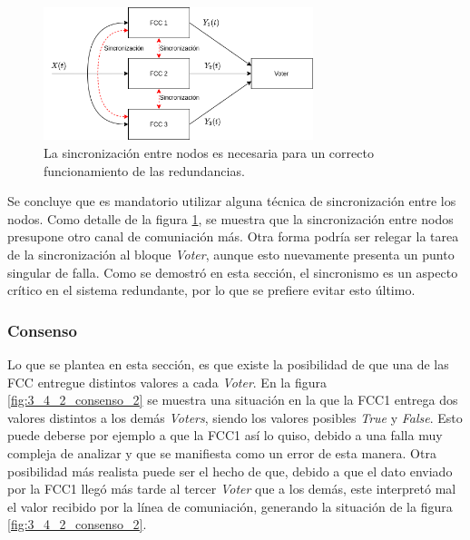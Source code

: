\begin{figure}[H]
    \centering
    \includegraphics[width=0.7\textwidth]{img/3_4_1_sincronizacion_3.png}
    \caption{La sincronización entre nodos es necesaria para un correcto funcionamiento de las redundancias.}
    \label{fig:3_4_1_sincronizacion_3}
\end{figure}

Se concluye que es mandatorio utilizar alguna técnica de sincronización entre los nodos. Como detalle de la figura \ref{fig:3_4_1_sincronizacion_3}, se muestra que la sincronización entre nodos presupone otro canal de comuniación más. Otra forma podría ser relegar la tarea de la sincronización al bloque \textit{Voter}, aunque esto nuevamente presenta un punto singular de falla. Como se demostró en esta sección, el sincronismo es un aspecto crítico en el sistema redundante, por lo que se prefiere evitar esto último.

\subsubsection{Consenso}\label{sec:consenso_TMR}

Lo que se plantea en esta sección, es que existe la posibilidad de que una de las FCC entregue distintos valores a cada \textit{Voter}. En la figura \ref{fig:3_4_2_consenso_2} se muestra una situación en la que la FCC1 entrega dos valores distintos a los demás \textit{Voters}, siendo los valores posibles \textit{True} y \textit{False}. Esto puede deberse por ejemplo a que la FCC1 así lo quiso, debido a una falla muy compleja de analizar y que se manifiesta como un error de esta manera. Otra posibilidad más realista puede ser el hecho de que, debido a que el dato enviado por la FCC1 llegó más tarde al tercer \textit{Voter} que a los demás, este interpretó mal el valor recibido por la línea de comuniación, generando la situación de la figura \ref{fig:3_4_2_consenso_2}. 


